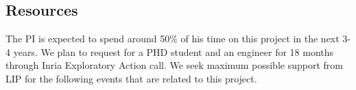 %
%
%	


\subsection*{Resources}

The PI is expected to spend around 50\% of his time on this project in the next 3-4 years. We plan to request for a PHD student and an engineer for 18 months through Inria Exploratory Action call. We seek maximum possible support from LIP for the following events that are related to this project.


